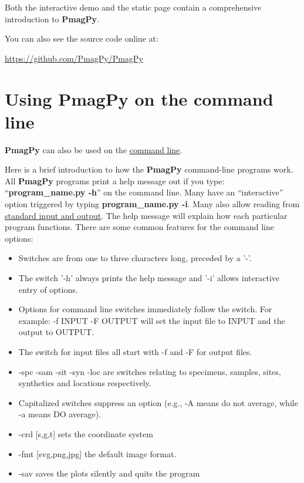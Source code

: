 \documentclass[11pt]{book}
\begin{document}
{{Both the interactive demo and the static page contain a comprehensive introduction to {\bf PmagPy}.

You can also see the source code online at:


 \url{https://github.com/PmagPy/PmagPy}



\section{Using PmagPy on the command line}

{\bf PmagPy}  can also be used on the \href{#command_line}{command line}.

Here is a brief introduction to how the {\bf PmagPy} command-line programs work.  All {\bf PmagPy} programs print a help message out if you type: ``{\bf program\_name.py -h}'' on the command line.  Many have an ``interactive'' option triggered by typing {\bf program\_name.py -i}.  Many also allow reading from \href{#standard_IO }{standard input and output}.   The help message will explain how each particular program functions.  There are some common features for the command line options:


\begin{itemize}
\item Switches are from one to three characters long, preceded by a '-'.
\item The switch '-h' always prints the help message and '-i' allows interactive entry of options.
\item  Options for command line switches immediately follow the switch.  For example:  -f INPUT -F OUTPUT will set the input file to INPUT and the output to OUTPUT.
\item  The switch for input  files all start with -f and -F for output files.
\item -spc -sam -sit -syn  -loc are switches relating to specimens, samples, sites, synthetics and locations respectively.
\item Capitalized switches suppress an option (e.g., -A means do not average, while -a means DO average).
\item -crd [s,g,t] sets the coordinate system
\item -fmt [svg,png,jpg] the default image format.
\item -sav  saves the plots silently and quits the program
\end{itemize}
\newcommand{\stt}{\small\tt}
\newcount\exnum
\outer{}


}}
\end{document}
